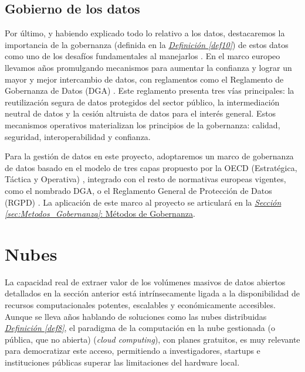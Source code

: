 \subsection{Gobierno de los datos}
\label{sec:EstudiosDatosGobernanza}

Por último, y habiendo explicado todo lo relativo a los datos, destacaremos la importancia de la gobernanza (definida en la \hyperref[def10]{\textit{Definición \ref*{def10}}}) de estos datos como uno de los desafíos fundamentales al manejarlos \citep{DataManagement2024Theodorakopoulos}. En el marco europeo llevamos años promulgando mecanismos para aumentar la confianza y lograr un mayor y mejor intercambio de datos, con reglamentos como el Reglamento de Gobernanza de Datos (DGA) \citep{EU_DGA_2022}. Este reglamento presenta tres vías principales: la reutilización segura de datos protegidos del sector público, la intermediación neutral de datos y la cesión altruista de datos para el interés general. Estos mecanismos operativos materializan los principios de la gobernanza: calidad, seguridad, interoperabilidad y confianza.

Para la gestión de datos en este proyecto, adoptaremos un marco de gobernanza de datos basado en el modelo de tres capas propuesto por la OECD (Estratégica, Táctica y Operativa) \citep{OECD2019}, integrado con el resto de normativas europeas vigentes, como el nombrado DGA, o el Reglamento General de Protección de Datos (RGPD) \citep{webRGPD2016Europa}. La aplicación de este marco al proyecto se articulará en la \hyperref[sec:Metodos_Gobernanza]{\textit{Sección \ref*{sec:Metodos_Gobernanza}}: Métodos de Gobernanza}. 

\section{Nubes}
\label{sec:EstudiosNubes}

La capacidad real de extraer valor de los volúmenes masivos de datos abiertos detallados en la sección anterior está intrínsecamente ligada a la disponibilidad de recursos computacionales potentes, escalables y económicamente accesibles. Aunque se lleva años hablando de soluciones como las nubes distribuidas \hyperref[def8]{\textit{Definición \ref*{def8}}}, el paradigma de la computación en la nube gestionada (o pública, que no abierta) (\textit{cloud computing}), con planes gratuitos, es muy relevante para democratizar este acceso, permitiendo a investigadores, startups e instituciones públicas superar las limitaciones del hardware local.

